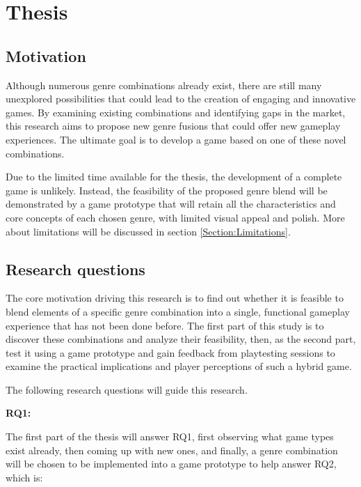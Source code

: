 \section{Thesis}



\subsection{Motivation}

Although numerous genre combinations already exist, there are still many unexplored possibilities that could lead to the creation of engaging and innovative games. By examining existing combinations and identifying gaps in the market, this research aims to propose new genre fusions that could offer new gameplay experiences. The ultimate goal is to develop a game based on one of these novel combinations.

Due to the limited time available for the thesis, the development of a complete game is unlikely. Instead, the feasibility of the proposed genre blend will be demonstrated by a game prototype that will retain all the characteristics and core concepts of each chosen genre, with limited visual appeal and polish. More about limitations will be discussed in section \ref{Section:Limitations}.



\subsection{Research questions}

The core motivation driving this research is to find out whether it is feasible to blend elements of a specific genre combination into a single, functional gameplay experience that has not been done before. The first part of this study is to discover these combinations and analyze their feasibility, then, as the second part, test it using a game prototype and gain feedback from playtesting sessions to examine the practical implications and player perceptions of such a hybrid game.

The following research questions will guide this research.

\textbf{RQ1:} \researchQuestionOne

The first part of the thesis will answer RQ1, first observing what game types exist already, then coming up with new ones, and finally, a genre combination will be chosen to be implemented into a game prototype to help answer RQ2, which is:

